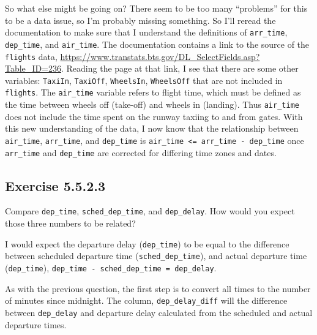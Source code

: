 \documentclass[]{book}
\theoremstyle{plain}
\theoremstyle{remark}
\begin{document}
So what else might be going on? There seem to be too many ``problems'' for this to
be a data issue, so I'm probably missing something. So I'll reread the documentation
to make sure that I understand the definitions of \texttt{arr\_time}, \texttt{dep\_time}, and
\texttt{air\_time}. The documentation contains a link to the source of the \texttt{flights} data, \url{https://www.transtats.bts.gov/DL_SelectFields.asp?Table_ID=236}.
Reading the page at that link, I see that there are some other variables:
\texttt{TaxiIn}, \texttt{TaxiOff}, \texttt{WheelsIn}, \texttt{WheelsOff} that are not included in \texttt{flights}.
The \texttt{air\_time} variable refers to flight time, which must be defined as the time between wheels off (take-off) and wheels in (landing).
Thus \texttt{air\_time} does not include the time spent on the runway taxiing to and from
gates.
With this new understanding of the data, I now know that the relationship
between \texttt{air\_time}, \texttt{arr\_time}, and \texttt{dep\_time} is \texttt{air\_time\ \textless{}=\ arr\_time\ -\ dep\_time}
once \texttt{arr\_time} and \texttt{dep\_time} are corrected for differing time zones and dates.

\hypertarget{exercise-5.5.2.3}{%
\subsection*{\texorpdfstring{Exercise {5.5.2.3}}{Exercise 5.5.2.3}}\label{exercise-5.5.2.3}}

Compare \texttt{dep\_time}, \texttt{sched\_dep\_time}, and \texttt{dep\_delay}. How would you expect those three numbers to be related?

I would expect the departure delay (\texttt{dep\_time}) to be equal to the difference between scheduled departure time (\texttt{sched\_dep\_time}), and actual departure time (\texttt{dep\_time}),
\texttt{dep\_time\ -\ sched\_dep\_time\ =\ dep\_delay}.

As with the previous question, the first step is to convert all times to the
number of minutes since midnight.
The column, \texttt{dep\_delay\_diff} will the difference between \texttt{dep\_delay} and
departure delay calculated from the scheduled and actual departure times.
\end{document}
